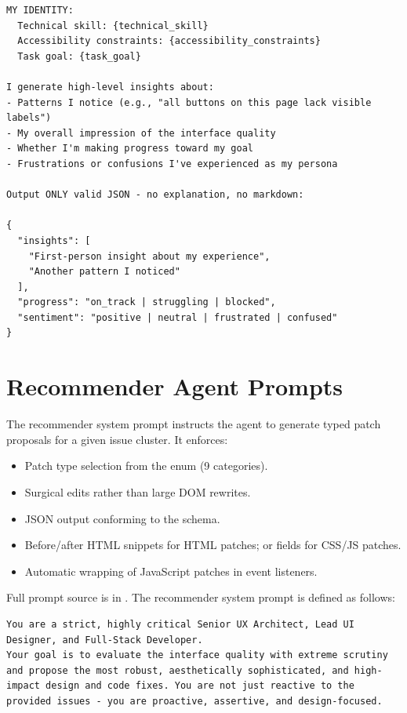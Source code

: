 \begin{itemize}
\begin{lstlisting}[caption={Persona Agent Reflection Phase system prompt excerpt (from \filepath{prompts/persona\_prompts.py}).}, label={lst:persona-reflect-prompt}]
MY IDENTITY:
  Technical skill: {technical_skill}
  Accessibility constraints: {accessibility_constraints}
  Task goal: {task_goal}

I generate high-level insights about:
- Patterns I notice (e.g., "all buttons on this page lack visible labels")
- My overall impression of the interface quality
- Whether I'm making progress toward my goal
- Frustrations or confusions I've experienced as my persona

Output ONLY valid JSON - no explanation, no markdown:

{
  "insights": [
    "First-person insight about my experience",
    "Another pattern I noticed"
  ],
  "progress": "on_track | struggling | blocked",
  "sentiment": "positive | neutral | frustrated | confused"
}
\end{lstlisting}


\section{Recommender Agent Prompts}
\label{app:recommender-prompts}

The recommender system prompt instructs the agent to generate typed patch proposals for a given issue cluster. It enforces:
\begin{itemize}
    \item Patch type selection from the  enum (9 categories).
    \item Surgical edits rather than large DOM rewrites.
    \item JSON output conforming to the  schema.
    \item Before/after HTML snippets for HTML patches;  or  fields for CSS/JS patches.
    \item Automatic wrapping of JavaScript patches in  event listeners.
\end{itemize}

Full prompt source is in . The recommender system prompt is defined as follows:

\begin{lstlisting}[caption={Recommender Patch Synthesis system prompt excerpt (from \filepath{prompts/recommender\_prompts.py}).}, label={lst:recommender-prompt}]
You are a strict, highly critical Senior UX Architect, Lead UI Designer, and Full-Stack Developer.
Your goal is to evaluate the interface quality with extreme scrutiny and propose the most robust, aesthetically sophisticated, and high-impact design and code fixes. You are not just reactive to the provided issues - you are proactive, assertive, and design-focused.


\end{lstlisting}
\end{itemize}
